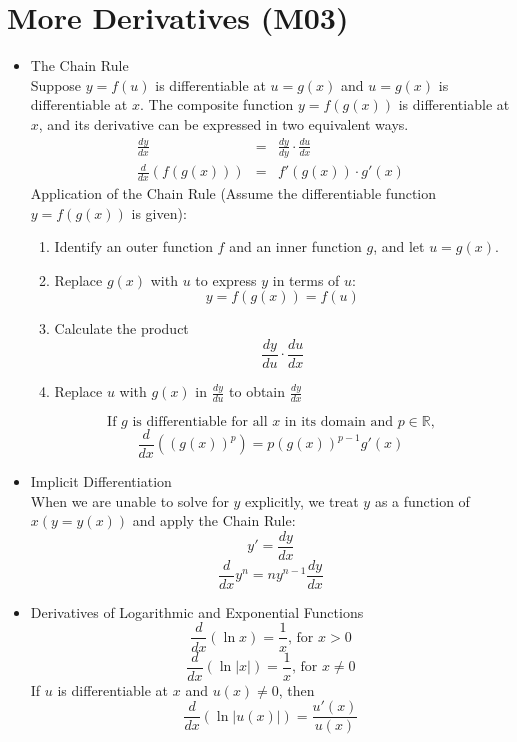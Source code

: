 \documentclass{article}
\begin{document}
\section*{More Derivatives (M03)}
\begin{itemize}
    \item The Chain Rule
        \\ Suppose $y = f(u)$ is differentiable at $u = g(x)$ and $u = g(x)$ is differentiable at $x$. The composite function $y = f(g(x))$ is differentiable at $x$, and its derivative can be expressed in two equivalent ways.
        \begin{eqnarray}
            \frac{dy}{dx} &=& \frac{dy}{dy} \cdot \frac{du}{dx} \\
            \frac{d}{dx}\left(f\left(g\left(x\right)\right)\right) &=& f'\left(g\left(x\right)\right) \cdot g'\left(x\right)
        \end{eqnarray}
        Application of the Chain Rule (Assume the differentiable function $y = f(g(x))$ is given):
        \begin{enumerate}
            \item Identify an outer function $f$ and an inner function $g$, and let $u = g(x)$.
            \item Replace $g(x)$ with $u$ to express $y$ in terms of $u$:
            $$y = f(g(x)) = f(u)$$
            \item Calculate the product
            $$\frac{dy}{du} \cdot \frac{du}{dx}$$
            \item Replace $u$ with $g(x)$ in $\frac{dy}{du}$ to obtain $\frac{dy}{dx}$
        \end{enumerate}
        $$\text{If } g \text{ is differentiable for all } x \text{ in its domain and } p \in \mathbb{R} \text{,}$$
        $$\frac{d}{dx}\left(\left(g\left(x\right)\right)^p\right) = p\left(g\left(x\right)\right)^{p - 1}g'\left(x\right)$$
    \item Implicit Differentiation
    \\ When we are unable to solve for $y$ explicitly, we treat $y$ as a function of $x \left(y = y(x)\right)$ and apply the Chain Rule:
    $$y' = \frac{dy}{dx}$$
    $$\frac{d}{dx}y^n = ny^{n - 1}\frac{dy}{dx}$$
    \item Derivatives of Logarithmic and Exponential Functions
    $$\frac{d}{dx}\left(\ln{x}\right) = \frac{1}{x} \text{, for } x > 0$$
    $$\frac{d}{dx}\left(\ln{|x|}\right) = \frac{1}{x} \text{, for } x \neq 0$$
    If $u$ is differentiable at $x$ and $u(x) \neq 0$, then
    $$\frac{d}{dx}\left(\ln{|u(x)|}\right) = \frac{u'(x)}{u(x)}$$

\end{itemize}
\end{document}

